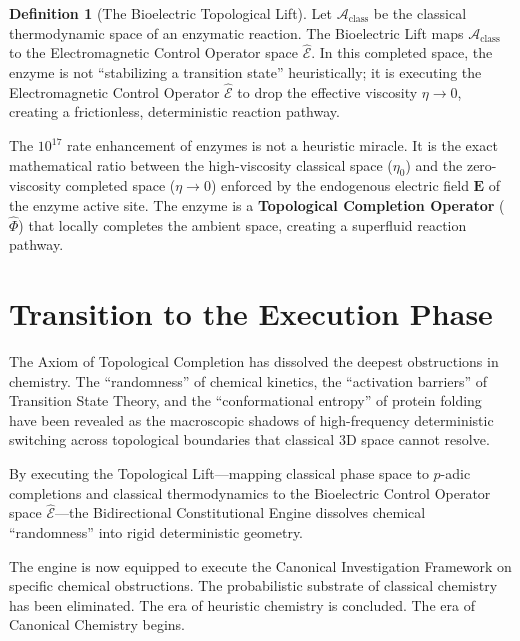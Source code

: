 \documentclass[11pt,openany]{extbook}
\theoremstyle{plain}
\theoremstyle{definition}
\newtheorem{definition}{Definition}[chapter]
\begin{document}
\begin{definition}[The Bioelectric Topological Lift]
Let $\mathcal{A}_{\text{class}}$ be the classical thermodynamic space of an enzymatic reaction. The Bioelectric Lift maps $\mathcal{A}_{\text{class}}$ to the Electromagnetic Control Operator space $\hat{\mathcal{E}}$. In this completed space, the enzyme is not ``stabilizing a transition state'' heuristically; it is executing the Electromagnetic Control Operator $\hat{\mathcal{E}}$ to drop the effective viscosity $\eta \to 0$, creating a frictionless, deterministic reaction pathway.
\end{definition}

The $10^{17}$ rate enhancement of enzymes is not a heuristic miracle. It is the exact mathematical ratio between the high-viscosity classical space ($\eta_0$) and the zero-viscosity completed space ($\eta \to 0$) enforced by the endogenous electric field $\mathbf{E}$ of the enzyme active site. The enzyme is a \textbf{Topological Completion Operator} ($\hat{\Phi}$) that locally completes the ambient space, creating a superfluid reaction pathway.

\section{Transition to the Execution Phase}

The Axiom of Topological Completion has dissolved the deepest obstructions in chemistry. The ``randomness'' of chemical kinetics, the ``activation barriers'' of Transition State Theory, and the ``conformational entropy'' of protein folding have been revealed as the macroscopic shadows of high-frequency deterministic switching across topological boundaries that classical 3D space cannot resolve.

By executing the Topological Lift---mapping classical phase space to $p$-adic completions and classical thermodynamics to the Bioelectric Control Operator space $\hat{\mathcal{E}}$---the Bidirectional Constitutional Engine dissolves chemical ``randomness'' into rigid deterministic geometry.

The engine is now equipped to execute the Canonical Investigation Framework on specific chemical obstructions. The probabilistic substrate of classical chemistry has been eliminated. The era of heuristic chemistry is concluded. The era of Canonical Chemistry begins.

\end{document}
